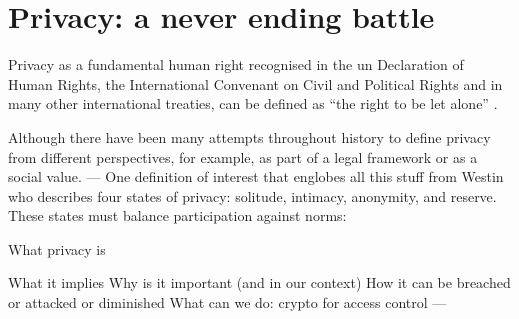 \documentclass[showtrims,oldfontcommands]{kthesis}
\begin{document}
\section{Privacy: a never ending battle}
    \label{section:privacy-a-never-ending-battle}

Privacy as a fundamental human right recognised in the \ac{un} Declaration of Human 
Rights, the International Convenant on Civil and Political Rights and in many other 
international treaties, can be defined as ``the right to be let alone'' \cite{Westin70}.

Although there have been many attempts throughout history to define privacy from different
perspectives, for example, as part of a legal framework or as a social value.
---
One definition of interest that englobes all this stuff from Westin who describes 
four states of privacy: solitude, intimacy, anonymity, and reserve. These states must balance participation against norms:




What privacy is


What it implies
Why is it important (and in our context)
How it can be breached or attacked or diminished
What can we do: crypto for access control
---

%
%
%
\end{document}
